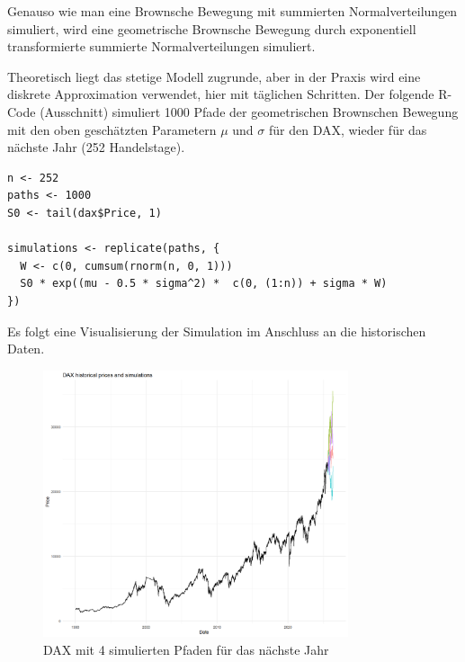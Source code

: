 Genauso wie man eine Brownsche Bewegung mit summierten Normalverteilungen simuliert, 
wird eine geometrische Brownsche Bewegung durch exponentiell transformierte
summierte Normalverteilungen simuliert. 


\begin{bsp}
Theoretisch liegt das stetige Modell zugrunde, 
aber in der Praxis wird eine diskrete Approximation verwendet, hier mit täglichen Schritten.
Der folgende R-Code (Ausschnitt) simuliert 1000 Pfade der geometrischen Brownschen Bewegung
mit den oben geschätzten Parametern $\mu$ und $\sigma$ für den DAX, wieder für das nächste Jahr (252 Handelstage).

\begin{lstlisting}
n <- 252
paths <- 1000
S0 <- tail(dax$Price, 1)

simulations <- replicate(paths, {
  W <- c(0, cumsum(rnorm(n, 0, 1)))
  S0 * exp((mu - 0.5 * sigma^2) *  c(0, (1:n)) + sigma * W)
})
\end{lstlisting}
Es folgt eine Visualisierung der Simulation im Anschluss an die historischen Daten.

\begin{figure}[H]
    \centering
    \includegraphics[width=0.8\textwidth]{images/dax_monte_carlo.png}
    \caption{DAX mit 4 simulierten Pfaden für das nächste Jahr}
    \label{fig:dax_monte_carlo}
\end{figure}

\end{bsp}

